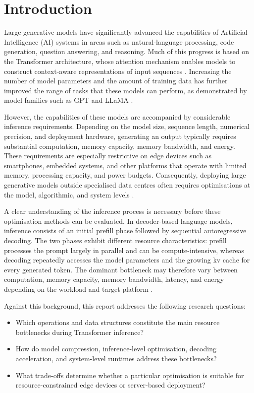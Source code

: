 \chapter{Introduction}
\label{chap:introduction}

Large generative models have significantly advanced the capabilities of Artificial
Intelligence (AI) systems in areas such as natural-language processing, code generation,
question answering, and reasoning. Much of this progress is based on the Transformer
architecture, whose attention mechanism enables models to construct context-aware
representations of input sequences \cite{vaswani2017attention}. Increasing the number of
model parameters and the amount of training data has further improved the range of tasks
that these models can perform, as demonstrated by model families such as GPT and LLaMA
\cite{brown2020gpt3,touvron2023llama}.

However, the capabilities of these models are accompanied by considerable inference
requirements. Depending on the model size, sequence length, numerical precision, and
deployment hardware, generating an output typically requires substantial computation,
memory capacity, memory bandwidth, and energy. These requirements are especially
restrictive on edge devices such as smartphones, embedded systems, and other platforms
that operate with limited memory, processing capacity, and power budgets. Consequently,
deploying large generative models outside specialised data centres often requires
optimisations at the model, algorithmic, and system levels
\cite{bai2024beyond,zhou2024efficientinf}.

A clear understanding of the inference process is necessary before these optimisation
methods can be evaluated. In decoder-based language models, inference consists of an
initial prefill phase followed by sequential autoregressive decoding. The two phases exhibit
different resource characteristics: prefill processes the prompt largely in parallel and can
be compute-intensive, whereas decoding repeatedly accesses the model parameters and the
growing \ac{kv} cache for every generated token. The dominant bottleneck may
therefore vary between computation, memory capacity, memory bandwidth, latency, and
energy depending on the workload and target platform
\cite{yuan2024llminference,zhou2024efficientinf}.

Against this background, this report addresses the following research questions:

\begin{itemize}
    \item Which operations and data structures constitute the main resource bottlenecks
    during Transformer inference?

    \item How do model compression, inference-level optimisation, decoding acceleration,
    and system-level runtimes address these bottlenecks?

    \item What trade-offs determine whether a particular optimisation is suitable for
    resource-constrained edge devices or server-based deployment?
\end{itemize}

